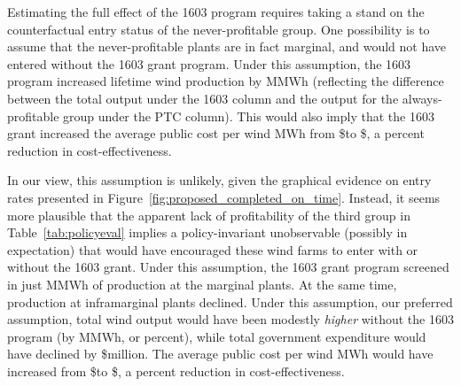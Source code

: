 \documentclass[12pt]{article}
\begin{document}
Estimating the full effect of the 1603 program requires taking a stand on the counterfactual entry status of the never-profitable group. One possibility is to assume that the never-profitable plants are in fact marginal, and would not have entered without the 1603 grant program. Under this assumption, the 1603 program increased lifetime wind production by MMWh (reflecting the difference between the total output under the 1603 column and the output for the always-profitable group under the PTC column). This would also imply that the 1603 grant increased the average public cost per wind MWh from \$to \$\unskip, a percent reduction in cost-effectiveness.

In our view, this assumption is unlikely, given the graphical evidence on entry rates presented in Figure~\ref{fig:proposed_completed_on_time}. Instead, it seems more plausible that the apparent lack of profitability of the third group in Table~\ref{tab:policyeval} implies a policy-invariant unobservable (possibly in expectation) that would have encouraged these wind farms to enter with or without the 1603 grant. Under this assumption, the 1603 grant program screened in just MMWh of production at the marginal plants. At the same time, production at inframarginal plants declined. Under this assumption, our preferred assumption, total wind output would have been modestly \emph{higher} without the 1603 program (by MMWh, or percent), while total government expenditure would have declined by \$million. The average public cost per wind MWh would have increased from \$to \$\unskip, a percent reduction in cost-effectiveness.
\end{document}
